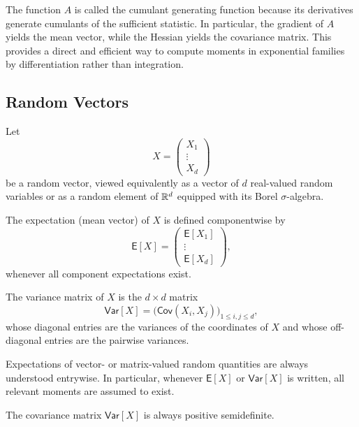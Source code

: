 \begin{remark}[Interpretation]
The function \(A\) is called the cumulant generating function because its
derivatives generate cumulants of the sufficient statistic. In particular, the
gradient of \(A\) yields the mean vector, while the Hessian yields the covariance
matrix. This provides a direct and efficient way to compute moments in exponential
families by differentiation rather than integration.
\end{remark}

\subsection{Random Vectors}
\label{sub:rv}

Let
\[
X = \begin{pmatrix}
X_1 \\ \vdots \\ X_d
\end{pmatrix}
\]
be a random vector, viewed equivalently as a vector of \(d\) real-valued random
variables or as a random element of \(\mathbb{R}^d\) equipped with its Borel
\(\sigma\)-algebra.

\begin{definition}
The expectation (mean vector) of \(X\) is defined componentwise by
\[
\mathsf{E}[X]
=
\begin{pmatrix}
\mathsf{E}[X_1] \\ \vdots \\ \mathsf{E}[X_d]
\end{pmatrix},
\]
whenever all component expectations exist.
\end{definition}

\begin{definition}
The variance matrix of \(X\) is the \(d \times d\) matrix
\[
\mathsf{Var}[X]
=
\bigl(\mathsf{Cov}(X_i,X_j)\bigr)_{1 \le i,j \le d},
\]
whose diagonal entries are the variances of the coordinates of \(X\) and whose
off-diagonal entries are the pairwise variances.
\end{definition}

\begin{remark}
Expectations of vector- or matrix-valued random quantities are always understood
entrywise. In particular, whenever \(\mathsf{E}[X]\) or \(\mathsf{Var}[X]\) is
written, all relevant moments are assumed to exist.
\end{remark}

\begin{remark}
The covariance matrix \(\mathsf{Var}[X]\) is always positive semidefinite. 
\end{remark}

